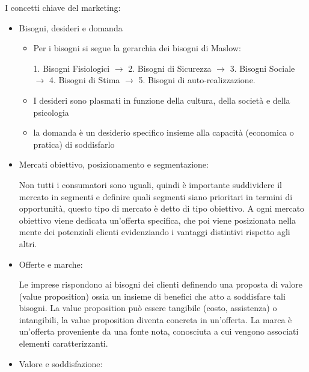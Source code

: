 \documentclass[11pt]{article}
\begin{document}
\noindent I concetti chiave del marketing: 
\begin{itemize}[topsep=0ex] %
	\item Bisogni, desideri e domanda
	\begin{itemize}[topsep=0ex,noitemsep]
		\item Per i bisogni si segue la gerarchia dei bisogni di Maslow:
		
		1. Bisogni Fisiologici $\to$ 2. Bisogni di Sicurezza 
		$\to$ 3. Bisogni Sociale $\to$ 4. Bisogni di Stima $\to$
		5. Bisogni di auto-realizzazione.
		
		\item I desideri sono plasmati in funzione della cultura, della società e della psicologia
		\item la domanda è un desiderio specifico insieme alla capacità (economica o pratica) di soddisfarlo
	\end{itemize}
	\item Mercati obiettivo, posizionamento e segmentazione:
	
	Non tutti i consumatori sono uguali, quindi è importante suddividere il mercato in segmenti e definire quali segmenti siano prioritari in termini di opportunità, questo tipo di mercato è detto di tipo obiettivo. A ogni mercato obiettivo viene dedicata un'offerta specifica, che poi viene posizionata nella mente dei potenziali clienti evidenziando i vantaggi distintivi rispetto agli altri.
	\item Offerte e marche:
	
	Le imprese rispondono ai bisogni dei clienti definendo una proposta di valore (value proposition) ossia un insieme di benefici che atto a soddisfare tali bisogni. La value proposition può essere tangibile (costo, assistenza) o intangibili, la value proposition diventa concreta in un'offerta. La marca è un'offerta proveniente da una fonte nota, conosciuta a cui vengono associati elementi caratterizzanti.
	\item Valore e soddisfazione:
	

\end{itemize}
\end{document}
